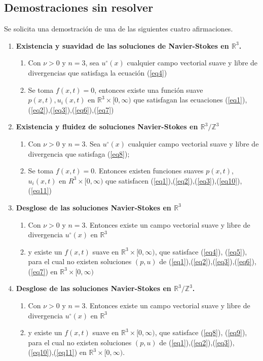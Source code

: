 \subsection{Demostraciones sin resolver}
Se solicita una demostración de una de las siguientes cuatro afirmaciones.
\begin{enumerate}
    \item \textbf{Existencia y suavidad de las soluciones de Navier-Stokes en $\mathbb{R}^3$.}
    \begin{enumerate}
        \item Con $\nu>0$ y $n=3$, sea $u^{\circ}(x)$ cualquier campo vectorial suave y libre de divergencias que satisfaga la ecuación (\ref{eq4})
        \item Se toma $f(x,t)=0$, entonces existe una función suave $p(x,t),u_i(x,t)$ en $\mathbb{R}^3\times [0,\infty)$ que satisfagan las ecuaciones (\ref{eq1}),(\ref{eq2}),(\ref{eq3}),(\ref{eq6}),(\ref{eq7})
    \end{enumerate}
    \item \textbf{Existencia y fluidez de soluciones Navier-Stokes en $\mathbb{R}^3/\mathbb{Z}^3$} \begin{enumerate}
        \item Con $\nu > 0$ y $n = 3$. Sea $u^{\circ}(x)$ cualquier campo vectorial suave y libre de divergencia que satisfaga (\ref{eq8});
        \item Se toma $f(x, t)=0$. Entonces existen funciones suaves $p(x, t)$, $u_i(x, t)$ en $R^3\times [0,\infty)$ que satisfacen (\ref{eq1}),(\ref{eq2}),(\ref{eq3}),(\ref{eq10}),(\ref{eq11})
    \end{enumerate}
    \item \textbf{Desglose de las soluciones Navier-Stokes en $\mathbb{R}^3$} \begin{enumerate}
        \item  Con $\nu > 0$ y $n = 3$. Entonces existe un campo vectorial suave y libre de divergencia $u^{\circ}(x)$ en $\mathbb{R}^3$
        \item y existe un $f(x, t)$ suave en $\mathbb{R}^3 \times [0,\infty)$, que satisface (\ref{eq4}), (\ref{eq5}), para el cual no existen soluciones $(p, u)$ de (\ref{eq1}),(\ref{eq2}),(\ref{eq3}),(\ref{eq6}),(\ref{eq7}) en $\mathbb{R}^3\times [0,\infty)$
    \end{enumerate}
    \item \textbf{Desglose de las soluciones Navier-Stokes en $\mathbb{R}^3/\mathbb{Z}^3$.} \begin{enumerate}
        \item Con $\nu > 0$ y $n = 3$. Entonces existe un campo vectorial suave y libre de divergencia $u^{\circ}(x)$ en $\mathbb{R}^3$
        \item y existe un $f(x, t)$ suave en $\mathbb{R}^3 \times [0,\infty)$, que satisface (\ref{eq8}), (\ref{eq9}), para el cual no existen soluciones $(p, u)$ de (\ref{eq1}),(\ref{eq2}),(\ref{eq3}),(\ref{eq10}),(\ref{eq11}) en $\mathbb{R}^3 \times [0,\infty)$.
    \end{enumerate}
\end{enumerate}
